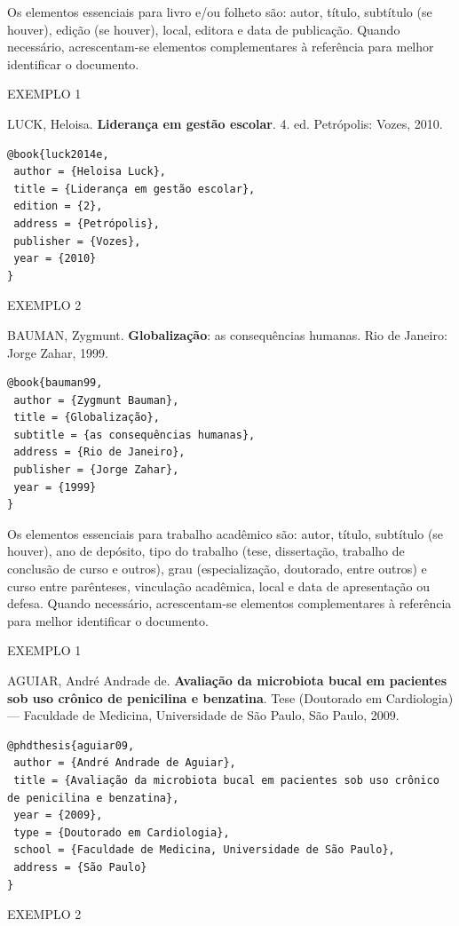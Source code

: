 Os elementos essenciais para livro e/ou folheto são: autor, título, subtítulo (se houver), edição (se houver), local, editora e data de publicação. Quando necessário, acrescentam-se elementos complementares à referência para melhor identificar o documento.

EXEMPLO 1

LUCK, Heloisa. \textbf{Liderança em gestão escolar}. 4. ed. Petrópolis: Vozes, 2010.

\begin{verbatim}
@book{luck2014e,
 author = {Heloisa Luck},
 title = {Liderança em gestão escolar},
 edition = {2},
 address = {Petrópolis},
 publisher = {Vozes},
 year = {2010}
}
\end{verbatim}

EXEMPLO 2

BAUMAN, Zygmunt. \textbf{Globalização}: as consequências humanas. Rio de Janeiro: Jorge Zahar, 1999.

\begin{verbatim}
@book{bauman99,
 author = {Zygmunt Bauman},
 title = {Globalização},
 subtitle = {as consequências humanas},
 address = {Rio de Janeiro},
 publisher = {Jorge Zahar},
 year = {1999}
}
\end{verbatim}

Os elementos essenciais para trabalho acadêmico são: autor, título, subtítulo (se houver), ano de depósito, tipo do trabalho (tese, dissertação, trabalho de conclusão de curso e outros), grau (especialização, doutorado, entre outros) e curso entre parênteses, vinculação acadêmica, local e data de apresentação ou defesa. Quando necessário, acrescentam-se elementos complementares à referência para melhor identificar o documento.

EXEMPLO 1

AGUIAR, André Andrade de. \textbf{Avaliação da microbiota bucal em pacientes sob uso crônico de penicilina e benzatina}. Tese (Doutorado em Cardiologia) — Faculdade de Medicina, Universidade de São Paulo, São Paulo, 2009.

\begin{verbatim}
@phdthesis{aguiar09,
 author = {André Andrade de Aguiar},
 title = {Avaliação da microbiota bucal em pacientes sob uso crônico de penicilina e benzatina},
 year = {2009},
 type = {Doutorado em Cardiologia},
 school = {Faculdade de Medicina, Universidade de São Paulo},
 address = {São Paulo}
}
\end{verbatim}

EXEMPLO 2

